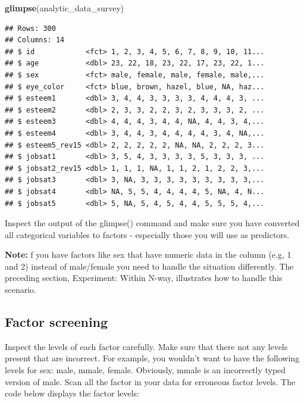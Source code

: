 \documentclass[
]{krantz}
\makeatletter
\newenvironment{Shaded}{\begin{snugshade}}{\end{snugshade}}
\newcommand{\KeywordTok}[1]{\textcolor[rgb]{0.27,0.27,0.27}{\textbf{#1}}}
\newcommand{\NormalTok}[1]{#1}
\newcommand{\OperatorTok}[1]{\textcolor[rgb]{0.43,0.43,0.43}{\textbf{#1}}}
\newcommand{\StringTok}[1]{\textcolor[rgb]{0.5,0.5,0.5}{#1}}
\newenvironment{kframe}{%
\medskip{}
\setlength{\fboxsep}{.8em}
 \def\at@end@of@kframe{}%
 \ifinner\ifhmode%
  \def\at@end@of@kframe{\end{minipage}}%
  \begin{minipage}{\columnwidth}%
 \fi\fi%
 \def\FrameCommand##1{\hskip\@totalleftmargin \hskip-\fboxsep
 \colorbox{shadecolor}{##1}\hskip-\fboxsep
     \hskip-\linewidth \hskip-\@totalleftmargin \hskip\columnwidth}%
 \MakeFramed {\advance\hsize-\width
   \@totalleftmargin\z@ \linewidth\hsize
   \@setminipage}}%
 {\par\unskip\endMakeFramed%
 \at@end@of@kframe}
\renewenvironment{Shaded}{\begin{kframe}}{\end{kframe}}
\makeatother
\begin{document}
\begin{Shaded}
\begin{Highlighting}[]
\KeywordTok{glimpse}\NormalTok{(analytic_data_survey)}
\end{Highlighting}
\end{Shaded}

\begin{verbatim}
## Rows: 300
## Columns: 14
## $ id            <fct> 1, 2, 3, 4, 5, 6, 7, 8, 9, 10, 11...
## $ age           <dbl> 23, 22, 18, 23, 22, 17, 23, 22, 1...
## $ sex           <fct> male, female, male, female, male,...
## $ eye_color     <fct> blue, brown, hazel, blue, NA, haz...
## $ esteem1       <dbl> 3, 4, 4, 3, 3, 3, 3, 4, 4, 4, 3, ...
## $ esteem2       <dbl> 2, 3, 3, 2, 2, 3, 2, 3, 3, 3, 2, ...
## $ esteem3       <dbl> 4, 4, 4, 3, 4, 4, NA, 4, 4, 3, 4,...
## $ esteem4       <dbl> 3, 4, 4, 3, 4, 4, 4, 4, 3, 4, NA,...
## $ esteem5_rev15 <dbl> 2, 2, 2, 2, 2, NA, NA, 2, 2, 2, 3...
## $ jobsat1       <dbl> 3, 5, 4, 3, 3, 3, 3, 5, 3, 3, 3, ...
## $ jobsat2_rev15 <dbl> 1, 1, 1, NA, 1, 1, 2, 1, 2, 2, 3,...
## $ jobsat3       <dbl> 3, NA, 3, 3, 3, 3, 3, 3, 3, 3, 3,...
## $ jobsat4       <dbl> NA, 5, 5, 4, 4, 4, 4, 5, NA, 4, N...
## $ jobsat5       <dbl> 5, NA, 5, 4, 5, 4, 4, 5, 5, 5, 4,...
\end{verbatim}

Inspect the output of the glimpse() command and make sure you have converted all categorical variables to factors - especially those you will use as predictors.

\textbf{Note:} f you have factors like sex that have numeric data in the column (e.g, 1 and 2) instead of male/female you need to handle the situation differently. The preceding section, Experiment: Within N-way, illustrates how to handle this scenario.

\hypertarget{factor-screening-3}{%
\subsection{Factor screening}\label{factor-screening-3}}

Inspect the levels of each factor carefully. Make sure that there not any levels present that are incorrect. For example, you wouldn't want to have the following levels for sex: male, mmale, female. Obviously, mmale is an incorrectly typed version of male. Scan all the factor in your data for erroneous factor levels. The code below displays the factor levels:

\begin{Shaded}
\end{Shaded}
\end{document}
